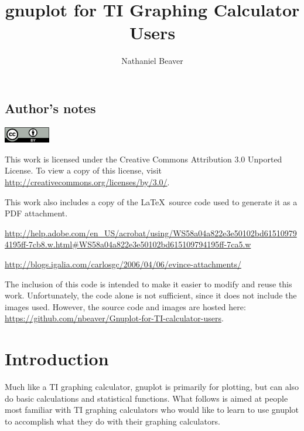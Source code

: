 \documentclass[11pt,letterpaper]{report}
\author{Nathaniel Beaver}
\title{gnuplot for TI Graphing Calculator Users}
\begin{document}
\maketitle

\lstset{
language=gnuplot,                       %
basicstyle=\ttfamily,                   %
}



\tableofcontents

\section{Author's notes}

\noindent \includegraphics[width=20mm]{cc-by.png}

This work is licensed under the Creative Commons Attribution 3.0 Unported License. To view a copy of this license, visit \url{http://creativecommons.org/licenses/by/3.0/}.

This work also includes a copy of the \LaTeX\ source code used to generate it as a PDF attachment.

\url{http://help.adobe.com/en_US/acrobat/using/WS58a04a822e3e50102bd615109794195ff-7cb8.w.html#WS58a04a822e3e50102bd615109794195ff-7ca5.w}

\url{http://blogs.igalia.com/carlosgc/2006/04/06/evince-attachments/}

The inclusion of this code is intended to make it easier to modify and reuse this work. Unfortunately, the code alone is not sufficient, since it does not include the images used. However, the source code and images are hosted here: \url{https://github.com/nbeaver/Gnuplot-for-TI-calculator-users}.


\chapter{Introduction}

Much like a TI graphing calculator, gnuplot is primarily for plotting, but can also do basic calculations and statistical functions. What follows is aimed at people most familiar with TI graphing calculators who would like to learn to use gnuplot to accomplish what they do with their graphing calculators.
\end{document}

